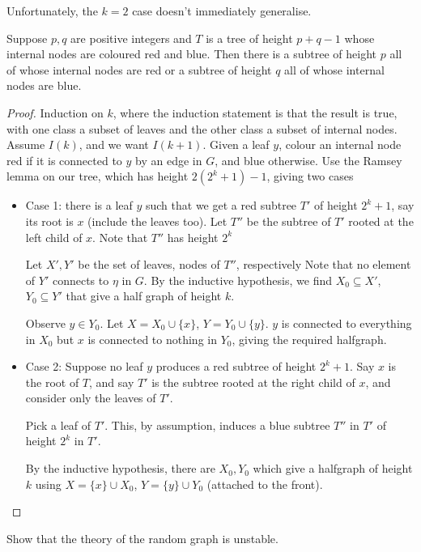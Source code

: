 \documentclass{article}
\begin{document}
Unfortunately, the $k=2$ case doesn't immediately generalise.
\begin{exercise}
  Suppose $p,q$ are positive integers and $T$ is a tree of height $p+q-1$ whose internal nodes are coloured red and blue.
  Then there is a subtree of height $p$ all of whose internal nodes are red or a subtree of height $q$ all of whose internal nodes are blue.
\end{exercise}
\begin{proof}
  Induction on $k$, where the induction statement is that the result is true, with one class a subset of leaves and the other class a subset of internal nodes.
  Assume $I(k)$, and we want $I(k+1)$.
  Given a leaf $y$, colour an internal node red if it is connected to $y$ by an edge in $G$, and blue otherwise.
  Use the Ramsey lemma on our tree, which has height $2(2^k + 1) - 1$, giving two cases
  \begin{itemize}
    \item Case 1: there is a leaf $y$ such that we get a red subtree $T'$ of height $2^k + 1$, say its root is $x$ (include the leaves too).
      Let $T''$ be the subtree of $T'$ rooted at the left child of $x$.
      Note that $T''$ has height $2^k$

      Let $X', Y'$ be the set of leaves, nodes of $T''$, respectively
      Note that no element of $Y'$ connects to $\eta$ in $G$.
      By the inductive hypothesis, we find $X_0 \subseteq X'$, $Y_0 \subseteq Y'$ that give a half graph of height $k$.

      Observe $y \in Y_0$. Let $X = X_0 \cup \{x\}$, $Y = Y_0 \cup \{y\}$.
      $y$ is connected to everything in $X_0$ but $x$ is connected to nothing in $Y_0$, giving the required halfgraph.
    \item Case 2: Suppose no leaf $y$ produces a red subtree of height $2^k + 1$.
      Say $x$ is the root of $T$, and say $T'$ is the subtree rooted at the right child of $x$, and consider only the leaves of $T'$.

      Pick a leaf of $T'$. This, by assumption, induces a blue subtree $T''$ in $T'$ of height $2^k$ in $T'$.

      By the inductive hypothesis, there are $X_0,Y_0$ which give a halfgraph of height $k$ using $X = \{x\} \cup X_0$, $Y = \{y\} \cup Y_0$ (attached to the front). \qedhere
  \end{itemize}
\end{proof}
\begin{exercise}
  Show that the theory of the random graph is unstable.
\end{exercise}
\end{document}
